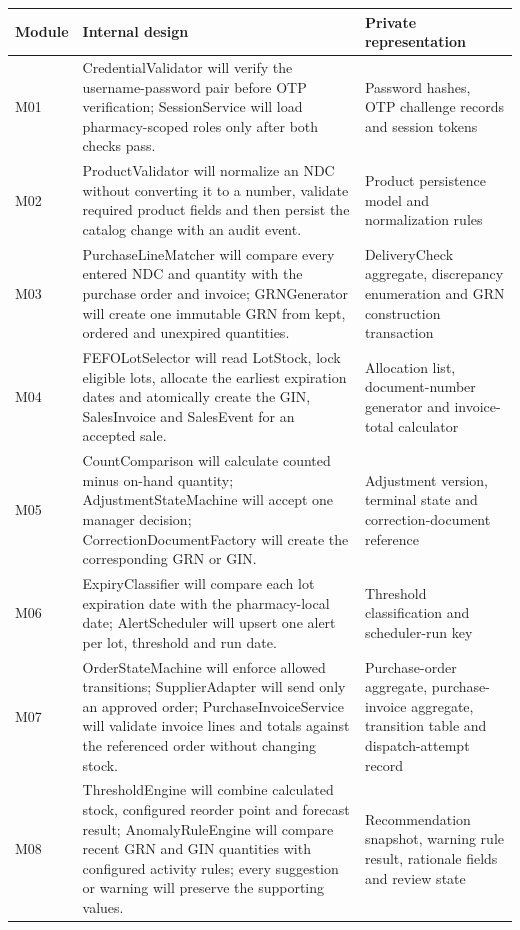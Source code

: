 {\def\LTcaptype{none}
\begin{longtable}[]{|
  >{\raggedright\arraybackslash}m{.10\linewidth}|
  >{\raggedright\arraybackslash}m{.49\linewidth}|
  >{\raggedright\arraybackslash}m{.31\linewidth}|}
\hline
\textbf{Module} & \textbf{Internal design} & \textbf{Private representation} \\ \hline
\endhead
M01 & CredentialValidator will verify the username-password pair before OTP verification; SessionService will load pharmacy-scoped roles only after both checks pass. & Password hashes, OTP challenge records and session tokens \\ \hline
M02 & ProductValidator will normalize an NDC without converting it to a number, validate required product fields and then persist the catalog change with an audit event. & Product persistence model and normalization rules \\ \hline
M03 & PurchaseLineMatcher will compare every entered NDC and quantity with the purchase order and invoice; GRNGenerator will create one immutable GRN from kept, ordered and unexpired quantities. & DeliveryCheck aggregate, discrepancy enumeration and GRN construction transaction \\ \hline
M04 & FEFOLotSelector will read LotStock, lock eligible lots, allocate the earliest expiration dates and atomically create the GIN, SalesInvoice and SalesEvent for an accepted sale. & Allocation list, document-number generator and invoice-total calculator \\ \hline
M05 & CountComparison will calculate counted minus on-hand quantity; AdjustmentStateMachine will accept one manager decision; CorrectionDocumentFactory will create the corresponding GRN or GIN. & Adjustment version, terminal state and correction-document reference \\ \hline
M06 & ExpiryClassifier will compare each lot expiration date with the pharmacy-local date; AlertScheduler will upsert one alert per lot, threshold and run date. & Threshold classification and scheduler-run key \\ \hline
M07 & OrderStateMachine will enforce allowed transitions; SupplierAdapter will send only an approved order; PurchaseInvoiceService will validate invoice lines and totals against the referenced order without changing stock. & Purchase-order aggregate, purchase-invoice aggregate, transition table and dispatch-attempt record \\ \hline
M08 & ThresholdEngine will combine calculated stock, configured reorder point and forecast result; AnomalyRuleEngine will compare recent GRN and GIN quantities with configured activity rules; every suggestion or warning will preserve the supporting values. & Recommendation snapshot, warning rule result, rationale fields and review state \\ \hline

\end{longtable}}

